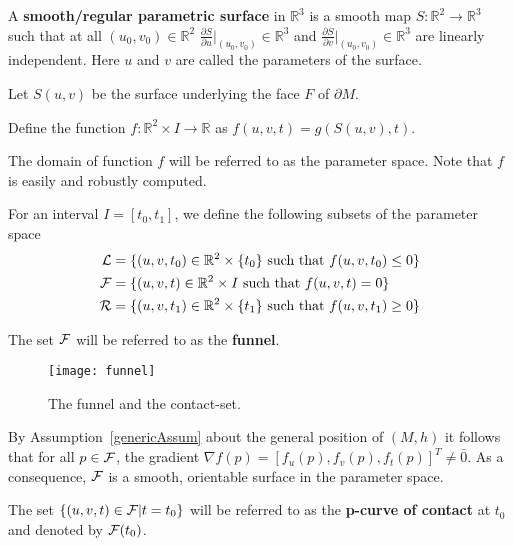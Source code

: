 \documentclass{elsart5p}
\begin{document}
\begin{defn} \label{parSurfDef}
A {\bf smooth/regular parametric surface} in $\mathbb{R}^3$ is a smooth map $S: \mathbb{R}^2 \to \mathbb{R}^3$
such that at all $(u_0,v_0) \in \mathbb{R}^2$   
$\frac{\partial S}{\partial u}|_{(u_0,v_0)} \in \mathbb{R}^3$ and $\frac{\partial S}{\partial v}|_{(u_0,v_0)} \in \mathbb{R}^3$ are linearly independent.  Here $u$ and $v$ are called 
the parameters of the surface.
\end{defn}

Let $S(u,v)$ be the surface underlying the face $F$ of $\partial M$.

\begin{defn} \label{fDef}
Define the function $f: \mathbb{R}^2 \times I \to \mathbb{R}$ as 
$f(u,v,t) = g(S(u,v), t)$.
\end{defn}
The domain of function $f$ will be referred to as the parameter space.  Note that $f$ is easily 
and robustly computed.
\begin{defn} \label{LFRDef}
For an interval $I = [t_0, t_1]$, we define the following subsets of the parameter space
\begin{align*}
{\cal L} &= \{ (u,v,t_0) \in \mathbb{R}^2 \times \{t_0\} \mbox{ such that } f(u,v,t_0)\leq 0 \} \\
{\cal F} &= \{ (u,v,t) \in \mathbb{R}^2 \times I \mbox{ such that } f(u,v,t)=0 \} \\
{\cal R} &= \{ (u,v,t_1) \in \mathbb{R}^2 \times \{t_1\} \mbox{ such that } f(u,v,t_1)\geq 0 \} 
\end{align*}
\end{defn}
The set ${\cal F}$ will be referred to as the {\bf funnel}.

\begin{figure}
 \centering
 \texttt{[image: funnel]}
 \caption{The funnel and the contact-set.}
 \label{funnelFig}
\end{figure}

By Assumption~\ref{genericAssum} about the general position of $(M,h)$ it follows that for all $p \in {\cal F}$, the gradient 
$\nabla f(p) = [f_u (p), f_v(p), f_t(p)]^T \neq \bar{0}$.  As a consequence, ${\cal F}$ is a smooth, orientable surface in the parameter space.

\begin{defn} \label{pcocDef}
The set $\{ (u,v,t) \in {\cal F} | t = t_0 \}$ will be referred to as the {\bf p-curve of contact} at $t_0$ and 
denoted by ${\cal F}(t_0)$.
\end{defn}
\end{document}

